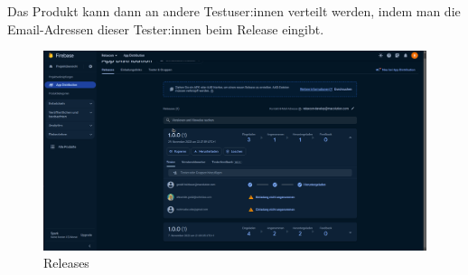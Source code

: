 Das Produkt kann dann an andere Testuser:innen verteilt werden, indem man die Email-Adressen dieser
Tester:innen beim Release eingibt.
\begin{figure}[H]
  \includegraphics[width=\textwidth]{./pics/firebase5.png}
  \caption{Releases}


\end{figure}



